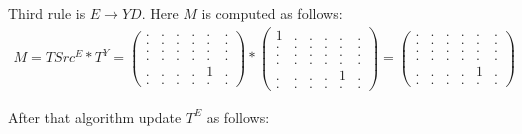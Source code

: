 Third rule is $E \to Y D$.
Here $M$ is computed as follows:
{
    \renewcommand{\arraystretch}{0.7}
    \setlength\arraycolsep{2pt}
\begin{align*}
M = TSrc^E * T^Y = 
\begin{pmatrix}
    . & . & . & . & . & . \\
    . & . & . & . & . & . \\
    . & . & . & . & . & . \\
    . & . & . & . & . & . \\ 
    . & . & . & . & 1 & . \\ 
    . & . & . & . & . & .
\end{pmatrix}*
\begin{pmatrix}
    1 & . & . & . & . & . \\
    . & . & . & . & . & . \\
    . & . & . & . & . & . \\
    . & . & . & . & . & . \\ 
    . & . & . & . & 1 & . \\ 
    . & . & . & . & . & .
\end{pmatrix}= 
\begin{pmatrix}
    . & . & . & . & . & . \\
    . & . & . & . & . & . \\
    . & . & . & . & . & . \\
    . & . & . & . & . & . \\ 
    . & . & . & . & 1 & . \\ 
    . & . & . & . & . & .
\end{pmatrix}
\end{align*}
}

After that algorithm update $T^E$ as follows:

